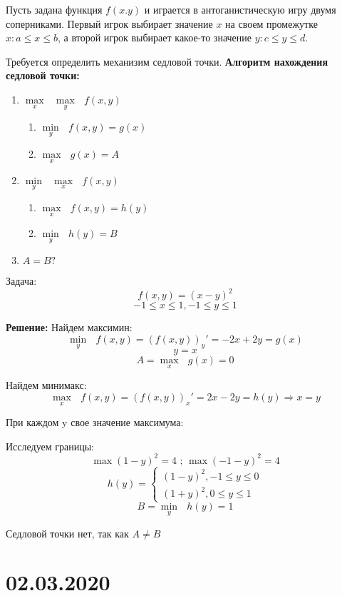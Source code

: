 \documentclass[aps,%
12pt,%
final,%
oneside,
onecolumn,%
musixtex, %
superscriptaddress,%
centertags]{article} %
\begin{document}
Пусть задана функция $f(x.y)$ и играется в антоганистическую игру двумя соперниками. 
Первый игрок выбирает значение $x$ на своем промежутке $x:a \leq x \leq b$, а второй игрок выбирает какое-то значение $y: c \leq y \leq d$. 

Требуется определить механизим седловой точки.\newpage
\textbf{Алгоритм нахождения седловой точки:}

\begin{enumerate}
  \item $ \underset{x}{\max} \text{ }\underset{y}{\max} \text{ }  f(x,y) $
  \begin{enumerate}
    \item $ \underset{y}{\min} \text{ } f(x,y) = g(x) $
    \item $ \underset{x}{\max} \text{ } g(x) = A $
  \end{enumerate}
  \item $ \underset{y}{\min} \text{ }\underset{x}{\max} \text{ }  f(x,y) $
  \begin{enumerate}
    \item $ \underset{x}{\max} \text{ } f(x,y) = h(y) $
    \item $ \underset{y}{\min} \text{ } h(y) = B $
  \end{enumerate}
  \item $A = B ?$

\end{enumerate}

Задача:
$$ f(x,y) = (x-y)^2 $$
$$ -1 \leq x \leq 1,-1 \leq y \leq 1 $$

\textbf{Решение:}
Найдем максимин:
$$ \underset{y}{\min} \text{ } f(x,y) = (f(x,y))_y'  = -2x + 2y = g(x)$$
$$ y = x $$
$$ A = \underset{x}{\max} \text{ } g(x) = 0 $$

Найдем минимакс:
$$ \underset{x}{\max} \text{ } f(x,y) = (f(x,y))_x'  = 2x -  2y = h(y) \Rightarrow x = y$$

При каждом y свое значение максимума:

Исследуем границы:
$$ \max (1-y)^2 = 4 \text{ ;  } \max (-1-y)^2 = 4 $$
$$h(y) = \left\{\begin{matrix}
(1-y)^2, -1 \leq y \leq 0\\ 
(1+y)^2, 0 \leq y \leq 1
\end{matrix}\right.$$
$$ B = \underset{y}{\min} \text{ } h(y) = 1 $$

Седловой точки нет, так как $A \neq B$

\section{02.03.2020}
\end{document}
